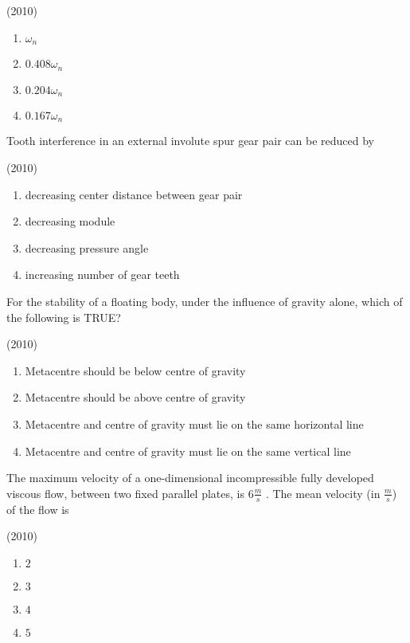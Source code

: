     \hfill{(2010)}

        \begin{multicols}{4}
            \begin{enumerate}
                \item $\omega_n$
                \item $0.408\omega_n$
                \item $0.204\omega_n$
                \item $0.167\omega_n$
            \end{enumerate}
        \end{multicols}
        
    \item Tooth interference in an external involute spur gear pair can be reduced by
    
    \hfill{(2010)}

        
            \begin{enumerate}
                \item decreasing center distance between gear pair
                \item decreasing module
                \item decreasing pressure angle
                \item increasing number of gear teeth
            \end{enumerate}
        

    \item For the stability of a floating body, under the influence of gravity alone, which of the following is TRUE?
    
    \hfill{(2010)}

        
            \begin{enumerate}
                \item Metacentre should be below centre of gravity
                \item Metacentre should be above centre of gravity
                \item Metacentre and centre of gravity must lie on the same horizontal line
                \item Metacentre and centre of gravity must lie on the same vertical line
            \end{enumerate}
        
        
    \item The maximum velocity of a one-dimensional incompressible fully developed viscous flow, between two fixed parallel plates, is $6\frac{m}{s}$ . The mean velocity (in $\frac{m}{s}$) of the flow is
    
    \hfill{(2010)}

        \begin{multicols}{4}
            \begin{enumerate}
                \item $2$
                \item $3$
                \item $4$
                \item $5$
            \end{enumerate}
        \end{multicols}

